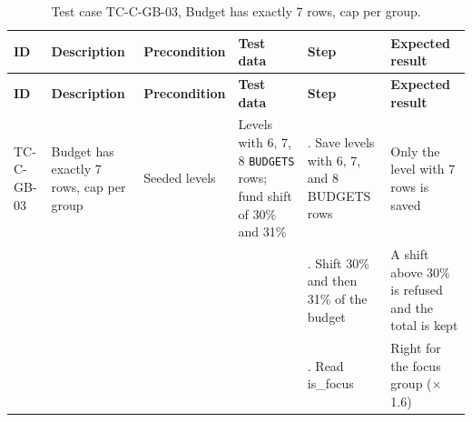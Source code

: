 {\footnotesize{}\renewcommand{\arraystretch}{1.1}
\begin{longtable}{|>{\raggedright\arraybackslash}p{}|>{\raggedright\arraybackslash}p{}|>{\raggedright\arraybackslash}p{}|>{\raggedright\arraybackslash}p{}|>{\raggedright\arraybackslash}p{}|>{\raggedright\arraybackslash}p{}|}
\caption{Test case TC-C-GB-03, Budget has exactly 7 rows, cap per group.} \\
\hline
\textbf{ID} & \textbf{Description} & \textbf{Precondition} & \textbf{Test data} & \textbf{Step} & \textbf{Expected result} \\ \hline
\endfirsthead
\hline
\textbf{ID} & \textbf{Description} & \textbf{Precondition} & \textbf{Test data} & \textbf{Step} & \textbf{Expected result} \\ \hline
\endhead
TC-C-GB-03 & Budget has exactly 7 rows, cap per group & Seeded levels & Levels with 6, 7, 8 \texttt{BUDGETS} rows; fund shift of 30\% and 31\% & 1. Save levels with 6, 7, and 8 BUDGETS rows & Only the level with 7 rows is saved \\ \cline{5-6}
 &  &  &  & 2. Shift 30\% and then 31\% of the budget & A shift above 30\% is refused and the total is kept \\ \cline{5-6}
 &  &  &  & 3. Read is\_focus & Right for the focus group ($\times$ 1.6) \\ \hline
\end{longtable}
}

